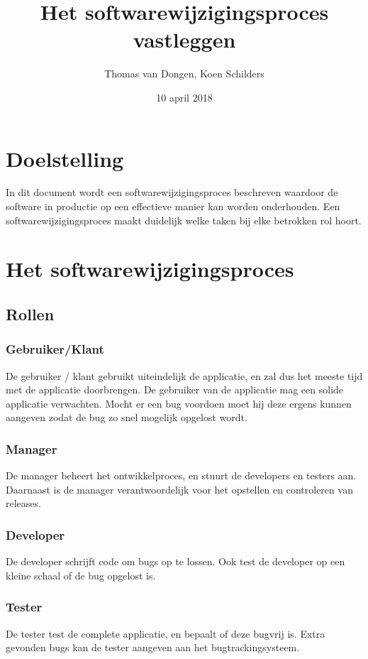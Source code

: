 \documentclass[12pt]{article}
\title{Het softwarewijzigingsproces vastleggen}
\author{Thomas van Dongen, Koen Schilders}
\date{10 april 2018}
\begin{document}
\begin{titlepage}
\maketitle
\end{titlepage}


\section{Doelstelling}
In dit document wordt een softwarewijzigingsproces beschreven waardoor de software in productie op een effectieve manier kan worden onderhouden. Een softwarewijzigingsproces maakt duidelijk welke taken bij elke betrokken rol hoort.


\section{Het softwarewijzigingsproces}
\subsection{Rollen}
\subsubsection{Gebruiker/Klant}
De gebruiker / klant gebruikt uiteindelijk de applicatie, en zal dus het meeste tijd met de applicatie doorbrengen. De gebruiker van de applicatie mag een solide applicatie verwachten. Mocht er een bug voordoen moet hij deze ergens kunnen aangeven zodat de bug zo snel mogelijk opgelost wordt.

\subsubsection{Manager}
De manager beheert het ontwikkelproces, en stuurt de developers en testers aan. Daarnaast is de manager verantwoordelijk voor het opstellen en controleren van releases.

\subsubsection{Developer}
De developer schrijft code om bugs op te lossen. Ook test de developer op een kleine schaal of de bug opgelost is.

\subsubsection{Tester}
De tester test de complete applicatie, en bepaalt of deze bugvrij is. Extra gevonden bugs kan de tester aangeven aan het bugtrackingsysteem.
\end{document}
